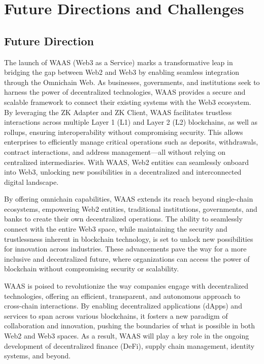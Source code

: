 

\section{Future Directions and Challenges}

\subsection{Future Direction}

The launch of WAAS (Web3 as a Service) marks a transformative leap in bridging the gap between Web2 and Web3 by enabling seamless integration through the Omnichain Web. As businesses, governments, and institutions seek to harness the power of decentralized technologies, WAAS provides a secure and scalable framework to connect their existing systems with the Web3 ecosystem. By leveraging the ZK Adapter and ZK Client, WAAS facilitates trustless interactions across multiple Layer 1 (L1) and Layer 2 (L2) blockchains, as well as rollups, ensuring interoperability without compromising security. This allows enterprises to efficiently manage critical operations such as deposits, withdrawals, contract interactions, and address management—all without relying on centralized intermediaries. With WAAS, Web2 entities can seamlessly onboard into Web3, unlocking new possibilities in a decentralized and interconnected digital landscape.

By offering omnichain capabilities, WAAS extends its reach beyond single-chain ecosystems, empowering Web2 entities, traditional institutions, governments, and banks to create their own decentralized operations. The ability to seamlessly connect with the entire Web3 space, while maintaining the security and trustlessness inherent in blockchain technology, is set to unlock new possibilities for innovation across industries. These advancements pave the way for a more inclusive and decentralized future, where organizations can access the power of blockchain without compromising security or scalability.

WAAS is poised to revolutionize the way companies engage with decentralized technologies, offering an efficient, transparent, and autonomous approach to cross-chain interactions. By enabling decentralized applications (dApps) and services to span across various blockchains, it fosters a new paradigm of collaboration and innovation, pushing the boundaries of what is possible in both Web2 and Web3 spaces. As a result, WAAS will play a key role in the ongoing development of decentralized finance (DeFi), supply chain management, identity systems, and beyond.

